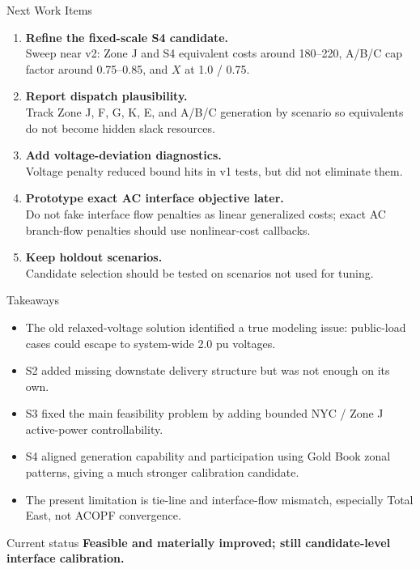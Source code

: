 \documentclass[aspectratio=169,10pt]{beamer}
\begin{document}
\begin{frame}{Next Work Items}
\begin{enumerate}
  \item \textbf{Refine the fixed-scale S4 candidate.}\\
  Sweep near v2: Zone J and S4 equivalent costs around 180--220, A/B/C cap factor around 0.75--0.85, and $X$ at 1.0 / 0.75.

  \item \textbf{Report dispatch plausibility.}\\
  Track Zone J, F, G, K, E, and A/B/C generation by scenario so equivalents do not become hidden slack resources.

  \item \textbf{Add voltage-deviation diagnostics.}\\
  Voltage penalty reduced bound hits in v1 tests, but did not eliminate them.

  \item \textbf{Prototype exact AC interface objective later.}\\
  Do not fake interface flow penalties as linear generalized costs; exact AC branch-flow penalties should use nonlinear-cost callbacks.

  \item \textbf{Keep holdout scenarios.}\\
  Candidate selection should be tested on scenarios not used for tuning.
\end{enumerate}
\end{frame}

\begin{frame}{Takeaways}
\begin{itemize}
  \item The old relaxed-voltage solution identified a true modeling issue: public-load cases could escape to system-wide 2.0 pu voltages.
  \item S2 added missing downstate delivery structure but was not enough on its own.
  \item S3 fixed the main feasibility problem by adding bounded NYC / Zone J active-power controllability.
  \item S4 aligned generation capability and participation using Gold Book zonal patterns, giving a much stronger calibration candidate.
  \item The present limitation is tie-line and interface-flow mismatch, especially Total East, not ACOPF convergence.
\end{itemize}

\vspace{0.7em}
\begin{block}{Current status}
\textbf{Feasible and materially improved; still candidate-level interface calibration.}
\end{block}
\end{frame}
\end{document}
